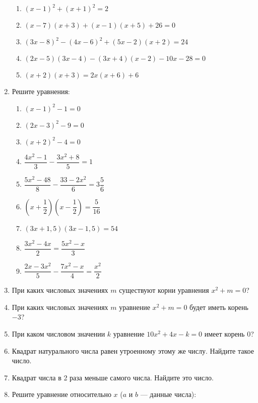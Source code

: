 \documentclass[10pt, a4paper]{article}
\begin{document}
\begin{enumerate}
\begin{enumerate}[label=\asbuk*)]
			\item $(x-1)^2+(x+1)^2=2$
			\item $(x-7)(x+3)+(x-1)(x+5)+26=0$
			\item $(3x-8)^2-(4x-6)^2+(5x-2)(x+2)=24$
			\item $(2x-5)(3x-4)-(3x+4)(x-2)-10x-28=0$
			\item $(x+2)(x+3)=2x(x+6)+6$
	\end{enumerate}
	\item Решите уравнения:
	\begin{enumerate}[label=\asbuk*)]
		\item $(x-1)^2-1=0$
		\item $(2x-3)^2-9=0$
		\item $(x+2)^2-4=0$
		\item $\dfrac{4x^2-1}{3}-\dfrac{3x^2+8}{5}=1$
		\item $\dfrac{5x^2-48}{8}-\dfrac{33-2x^2}{6}=3\dfrac{5}{6}$
		\item $\left(x+\dfrac{1}{2}\right)\left(x-\dfrac{1}{2}\right)=\dfrac{5}{16}$
		\item $(3x+1,5)(3x-1,5)=54$
		\item $\dfrac{3x^2-4x}{2}=\dfrac{5x^2-x}{3}$
		\item $\dfrac{2x-3x^2}{5}-\dfrac{7x^2-x}{4}=\dfrac{x^2}{2}$
	\end{enumerate}
	\item При каких числовых значениях $m$ существуют корни уравнения $x^2+m=0$?
	\item При каких числовых значениях $m$ уравнение $x^2+m=0$ будет иметь корень $-3$?
	\item При каком числовом значении $k$ уравнение $10x^2+4x-k=0$ имеет корень $0$?
	\item Квадрат натурального числа равен утроенному этому же числу. Найдите такое число.
	\item Квадрат числа в 2 раза меньше самого числа. Найдите это число.
	\item Решите уравнение относительно $x$ ($a$ и $b$ — данные числа):
	\begin{enumerate}[label=\asbuk*)]
	\end{enumerate}

\end{enumerate}
\end{document}
